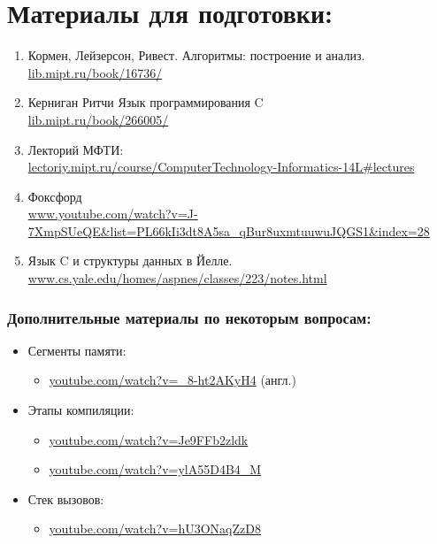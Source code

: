 \documentclass{article}
\begin{document}
\section*{Материалы для подготовки:}
\begin{enumerate}
\item Кормен, Лейзерсон, Ривест. Алгоритмы: построение и анализ.\\ 
\hspace*{16pt} \href{https://lib.mipt.ru/book/16736/}{lib.mipt.ru/book/16736/}
\item Керниган Ритчи Язык программирования C \\
\hspace*{16pt} \href{https://lib.mipt.ru/book/266005/}{lib.mipt.ru/book/266005/}
\item Лекторий МФТИ: \\ \hspace*{16pt} 
\href{http://lectoriy.mipt.ru/course/ComputerTechnology-Informatics-14L#lectures}
{lectoriy.mipt.ru/course/ComputerTechnology-Informatics-14L\#lectures}
\item Фоксфорд\\
\href{https://www.youtube.com/watch?v=J-7XmpSUeQE&list=PL66kIi3dt8A5sa_qBur8uxmtuuwuJQGS1&index=28}
{www.youtube.com/watch?v=J-7XmpSUeQE\&list=PL66kIi3dt8A5sa\_qBur8uxmtuuwuJQGS1\&index=28}
\item Язык C и структуры данных в Йелле.\\ \hspace*{16pt} \href{http://www.cs.yale.edu/homes/aspnes/classes/223/notes.html}{www.cs.yale.edu/homes/aspnes/classes/223/notes.html}
\end{enumerate}

\subsubsection*{Дополнительные материалы по некоторым вопросам:}
\begin{itemize}

\item Сегменты памяти:
\begin{itemize}
\item \href{https://www.youtube.com/watch?v=_8-ht2AKyH4}{youtube.com/watch?v=\_8-ht2AKyH4}  (англ.)
\end{itemize}
\item Этапы компиляции:
\begin{itemize}
\item \href{https://www.youtube.com/watch?v=Je9FFb2zldk}{youtube.com/watch?v=Je9FFb2zldk}
\item \href{https://www.youtube.com/watch?v=ylA55D4B4_M}{youtube.com/watch?v=ylA55D4B4\_M}
\end{itemize}
\item Стек вызовов:
\begin{itemize}
\item \href{https://www.youtube.com/watch?v=hU3ONaqZzD8}{youtube.com/watch?v=hU3ONaqZzD8}
\end{itemize}


\end{itemize}
\end{document}

